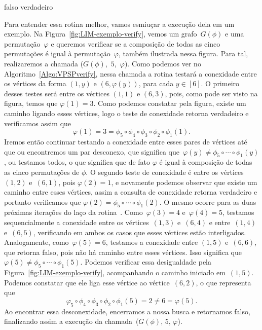 \begin{algorithm}[htb]
\caption{\VPSPverify($G(\phi)$, $i$, $\varphi$)}
\label{Algo:VPSPverify}
\begin{algorithmic}[1]
    \State \Return falso
  \EndIf
\EndFor
\State \Return verdadeiro
\end{algorithmic}
\end{algorithm}

Para entender essa rotina melhor, vamos esmiuçar a execução dela em um exemplo. Na Figura~\ref{fig:LIM-exemplo-verify}, vemos um grafo~$G(\phi)$ e uma permutação~$\varphi$ e queremos verificar se a composição de todas as cinco permutações é igual à permutação~$\varphi$, também ilustrada nessa figura. Para tal, realizaremos a chamada \mbox{\VPSPverify($G(\phi)$, $5$, $\varphi$)}. Como podemos ver no Algoritmo~\ref{Algo:VPSPverify}, nessa chamada a rotina \VPSPverify{} testará a conexidade entre os vértices da forma $(1,y)$ e $(6,\varphi(y))$, para cada $y\in [6]$. O primeiro desses testes será entre os vértices $(1,1)$ e $(6,3)$, pois, como pode ser visto na figura, temos que $\varphi(1) = 3$. Como podemos constatar pela figura, existe um caminho ligando esses vértices, logo o teste de conexidade retorna verdadeiro e verificamos assim que
$$
\varphi(1) = 3 = \phi_5\circ \phi_4\circ \phi_3\circ \phi_2\circ \phi_1(1).
$$
Iremos então continuar testando a conexidade entre esses pares de vértices até que ou encontremos um par desconexo, que significa que~$\varphi(y) \neq \phi_5\circ\cdots\circ \phi_1(y)$, ou testamos todos, o que significa que de fato $\varphi$ é igual à composição de todas as cinco permutações de $\phi$. O segundo teste de conexidade é entre os vértices~$(1,2)$ e~$(6,1)$, pois $\varphi(2)=1$, e novamente podemos observar que existe um caminho entre esses vértices, assim a consulta de conexidade retorna verdadeiro e portanto verificamos que $\varphi(2) = \phi_5\circ\cdots\circ \phi_1(2)$. O mesmo ocorre para as duas próximas iterações do laço da rotina~\VPSPverify{}. Como~$\varphi(3)=4$ e~$\varphi(4)=5$, testamos sequencialmente a conexidade entre os vértices~$(1,3)$ e~$(6,4)$ e entre~$(1,4)$ e~$(6,5)$, verificando em ambos os casos que esses vértices estão interligados. Analogamente, como~$\varphi(5)=6$, testamos a conexidade entre $(1,5)$ e~$(6,6)$, que retorna falso, pois não há caminho entre esses vértices. Isso significa que~$\varphi(5)\neq \phi_5\circ\cdots\circ \phi_1(5)$. Podemos verificar essa desigualdade pela Figura~\ref{fig:LIM-exemplo-verify}, acompanhando o caminho iniciado em~$(1,5)$. Podemos constatar que ele liga esse vértice ao vértice~$(6,2)$, o que representa que
$$
 \varphi_5\circ \phi_4\circ \phi_3\circ \phi_2\circ \phi_1(5) = 2 \neq 6 = \varphi(5).
$$
Ao encontrar essa desconexidade, encerramos a nossa busca e retornamos falso, finalizando assim a execução da chamada~\VPSPverify($G(\phi)$, $5$, $\varphi$).

